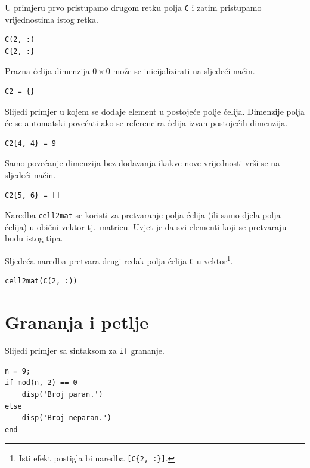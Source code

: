 \documentclass[a4paper, 10pt]{article}
\newcommand{\spec}[1]{\texttt{#1}} %
\begin{document}
U primjeru prvo pristupamo drugom retku polja \spec{C} i zatim pristupamo vrijednostima istog retka.

\begin{lstlisting}
C(2, :)
C{2, :}
\end{lstlisting}

Prazna ćelija dimenzija $0 \times 0$ može se inicijalizirati na sljedeći način.

\begin{lstlisting}
C2 = {}
\end{lstlisting}

Slijedi primjer u kojem se dodaje element u postojeće polje ćelija.
Dimenzije polja će se automatski povećati ako se referencira ćelija izvan postojećih dimenzija.

\begin{lstlisting}
C2{4, 4} = 9
\end{lstlisting}

Samo povećanje dimenzija bez dodavanja ikakve nove vrijednosti vrši se na sljedeći način.

\begin{lstlisting}
C2{5, 6} = []
\end{lstlisting}

Naredba \spec{cell2mat} se koristi za pretvaranje polja ćelija (ili samo djela polja ćelija) u obični vektor tj.\ matricu.
Uvjet je da svi elementi koji se pretvaraju budu istog tipa.

Sljedeća naredba pretvara drugi redak polja ćelija \spec{C} u vektor\footnote{Isti efekt postigla bi naredba \spec{[C\{2, :\}]}.}.

\begin{lstlisting}
cell2mat(C(2, :))
\end{lstlisting}


\section{Grananja i petlje}

Slijedi primjer sa sintaksom za \spec{if} grananje.

\begin{lstlisting}
n = 9;
if mod(n, 2) == 0
    disp('Broj paran.')
else
    disp('Broj neparan.')
end
\end{lstlisting}
\end{document}
